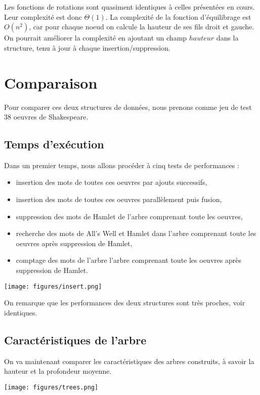 \documentclass[11pt]{report} %
\begin{document}
Les fonctions de rotations sont quasiment identiques à celles présentées en cours. Leur complexité est donc $\Theta(1)$. La complexité de la fonction d'équilibrage est $O(n^2)$, car pour chaque noeud on calcule la hauteur de ses fils droit et gauche. On pourrait améliorer la complexité en ajoutant un champ $hauteur$ dans la structure, tenu à jour à chaque insertion/suppression.

\chapter{Comparaison}

Pour comparer ces deux structures de données, nous prenons comme jeu de test 38 oeuvres de Shakespeare.

\section{Temps d'exécution}

Dans un premier temps, nous allons procéder à cinq tests de performances :
\begin{itemize}
\item insertion des mots de toutes ces oeuvres par ajouts successifs,
\item insertion des mots de toutes ces oeuvres parallèlement puis fusion,
\item suppression des mots de Hamlet de l'arbre comprenant toute les oeuvres,
\item recherche des mots de All's Well et Hamlet dans l'arbre comprenant toute les oeuvres après suppression de Hamlet,
\item comptage des mots de l'arbre l'arbre comprenant toute les oeuvres après suppression de Hamlet.
\end{itemize}

\begin{center}
\texttt{[image: figures/insert.png]}
\end{center}

On remarque que les performances des deux structures sont très proches, voir identiques.

\section{Caractéristiques de l'arbre}

On va maintenant comparer les caractéristiques des arbres construits, à savoir la hauteur et la profondeur moyenne.
\begin{center}
\texttt{[image: figures/trees.png]}
\end{center}
\end{document}
